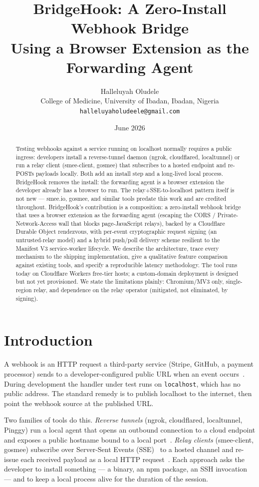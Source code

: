 \documentclass[11pt]{article}
\title{\textbf{BridgeHook: A Zero-Install Webhook Bridge\\Using a Browser Extension as the Forwarding Agent}}
\author{Halleluyah Oludele\\
College of Medicine, University of Ibadan, Ibadan, Nigeria\\
\texttt{halleluyaholudeele@gmail.com}}
\date{June 2026}
\begin{document}
\maketitle

\begin{abstract}
Testing webhooks against a service running on localhost normally requires a public ingress: developers install a reverse-tunnel daemon (ngrok, cloudflared, localtunnel) or run a relay client (smee-client, gosmee) that subscribes to a hosted endpoint and re-POSTs payloads locally. Both add an install step and a long-lived local process. BridgeHook removes the install: the forwarding agent is a browser extension the developer already has a browser to run. The relay+SSE-to-localhost pattern itself is not new --- smee.io, gosmee, and similar tools predate this work and are credited throughout. BridgeHook's contribution is a composition: a zero-install webhook bridge that uses a browser extension as the forwarding agent (escaping the CORS / Private-Network-Access wall that blocks page-JavaScript relays), backed by a Cloudflare Durable Object rendezvous, with per-event cryptographic request signing (an untrusted-relay model) and a hybrid push/poll delivery scheme resilient to the Manifest V3 service-worker lifecycle. We describe the architecture, trace every mechanism to the shipping implementation, give a qualitative feature comparison against existing tools, and specify a reproducible latency methodology. The tool runs today on Cloudflare Workers free-tier hosts; a custom-domain deployment is designed but not yet provisioned. We state the limitations plainly: Chromium/MV3 only, single-region relay, and dependence on the relay operator (mitigated, not eliminated, by signing).
\end{abstract}

\section{Introduction}
\label{sec:intro}

A webhook is an HTTP request a third-party service (Stripe, GitHub, a payment
processor) sends to a developer-configured public URL when an event
occurs~\cite{stripewebhooks,githubwebhooks}. During development the handler
under test runs on \texttt{localhost}, which has no public address. The
standard remedy is to publish localhost to the internet, then point the webhook
source at the published URL.

Two families of tools do this. \emph{Reverse tunnels} (ngrok, cloudflared,
localtunnel, Pinggy) run a local agent that opens an outbound connection to a
cloud endpoint and exposes a public hostname bound to a local
port~\cite{ngrok,cloudflaretunnel,localtunnel,pinggy}. \emph{Relay clients}
(smee-client, gosmee) subscribe over Server-Sent Events (SSE)~\cite{htmlsse} to
a hosted channel and re-issue each received payload as a local HTTP
request~\cite{smeeclient,gosmee}. Each approach asks the developer to install
something --- a binary, an npm package, an SSH invocation --- and to keep a
local process alive for the duration of the session.
\end{document}
